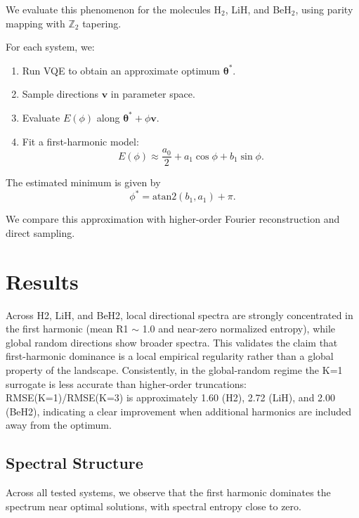 \documentclass[12pt]{article}
\begin{document}
We evaluate this phenomenon for the molecules H$_2$, LiH, and BeH$_2$, using parity mapping with $\mathbb{Z}_2$ tapering.

For each system, we:
\begin{enumerate}
    \item Run VQE to obtain an approximate optimum $\boldsymbol{\theta}^*$.
    \item Sample directions $\mathbf{v}$ in parameter space.
    \item Evaluate $E(\phi)$ along $\boldsymbol{\theta}^* + \phi \mathbf{v}$.
    \item Fit a first-harmonic model:
    \begin{equation}
    E(\phi) \approx \frac{a_0}{2} + a_1 \cos\phi + b_1 \sin\phi.
    \end{equation}
\end{enumerate}

The estimated minimum is given by
\begin{equation}
\phi^* = \mathrm{atan2}(b_1, a_1) + \pi.
\end{equation}

We compare this approximation with higher-order Fourier reconstruction and direct sampling.

\section{Results}

Across H2, LiH, and BeH2, local directional spectra are strongly concentrated in the first harmonic (mean R1 $\sim$ 
1.0 and near-zero normalized entropy), while global random directions show broader spectra. This validates the claim that first-harmonic dominance is a local empirical regularity rather than a global property of the landscape. Consistently, in the global-random regime the K=1 surrogate is less accurate than higher-order truncations: RMSE(K=1)/RMSE(K=3) is approximately 1.60 (H2), 2.72 (LiH), and 2.00 (BeH2), indicating a clear improvement when additional harmonics are included away from the optimum.

\subsection{Spectral Structure}

Across all tested systems, we observe that the first harmonic dominates the spectrum near optimal solutions, with spectral entropy close to zero.
\end{document}
